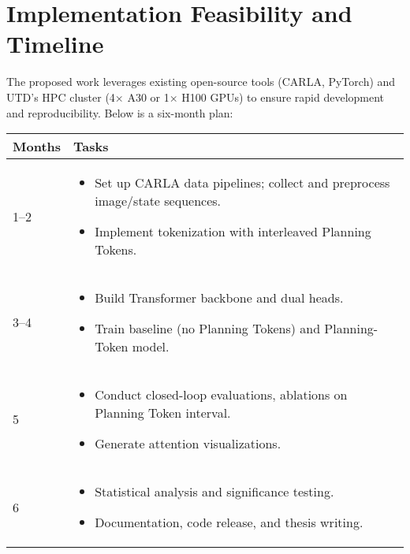 \documentclass[11pt,a4paper]{article}
\begin{document}
\section*{Implementation Feasibility and Timeline}

The proposed work leverages existing open-source tools (CARLA, PyTorch) and UTD’s HPC cluster (4× A30 or 1× H100 GPUs) to ensure rapid development and reproducibility. Below is a six-month plan:

\begin{tabular}{p{3cm}p{10cm}}
    \toprule
    \textbf{Months} & \textbf{Tasks}                                                                  \\
    \midrule
    1--2            & \begin{itemize}[nosep]
                          \item Set up CARLA data pipelines; collect and preprocess image/state sequences.
                          \item Implement tokenization with interleaved Planning Tokens.
                      \end{itemize} \\

    3--4            & \begin{itemize}[nosep]
                          \item Build Transformer backbone and dual heads.
                          \item Train baseline (no Planning Tokens) and Planning-Token model.
                      \end{itemize}              \\

    5               & \begin{itemize}[nosep]
                          \item Conduct closed-loop evaluations, ablations on Planning Token interval.
                          \item Generate attention visualizations.
                      \end{itemize}     \\

    6               & \begin{itemize}[nosep]
                          \item Statistical analysis and significance testing.
                          \item Documentation, code release, and thesis writing.
                      \end{itemize}                           \\
    \bottomrule
\end{tabular}
\end{document}
